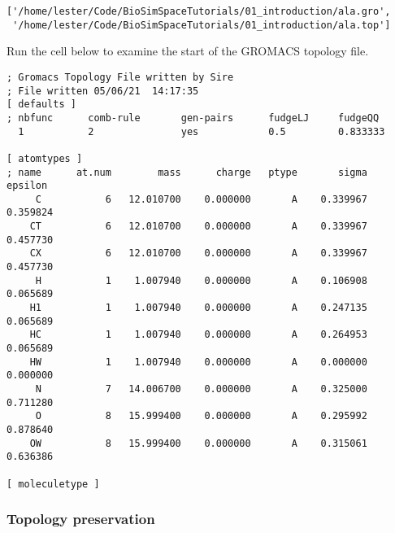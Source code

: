 \begin{Shaded}
\begin{Highlighting}[]
\NormalTok{, system, [}\NormalTok{, }\NormalTok{])}
\end{Highlighting}
\end{Shaded}

\begin{verbatim}
['/home/lester/Code/BioSimSpaceTutorials/01_introduction/ala.gro',
 '/home/lester/Code/BioSimSpaceTutorials/01_introduction/ala.top']
\end{verbatim}

Run the cell below to examine the start of the GROMACS topology file.

\begin{Shaded}
\begin{Highlighting}[]
\OperatorTok{!}\OperatorTok{-}
\end{Highlighting}
\end{Shaded}

\begin{verbatim}
; Gromacs Topology File written by Sire
; File written 05/06/21  14:17:35
[ defaults ]
; nbfunc      comb-rule       gen-pairs      fudgeLJ     fudgeQQ
  1           2               yes            0.5         0.833333

[ atomtypes ]
; name      at.num        mass      charge   ptype       sigma     epsilon
     C           6   12.010700    0.000000       A    0.339967    0.359824
    CT           6   12.010700    0.000000       A    0.339967    0.457730
    CX           6   12.010700    0.000000       A    0.339967    0.457730
     H           1    1.007940    0.000000       A    0.106908    0.065689
    H1           1    1.007940    0.000000       A    0.247135    0.065689
    HC           1    1.007940    0.000000       A    0.264953    0.065689
    HW           1    1.007940    0.000000       A    0.000000    0.000000
     N           7   14.006700    0.000000       A    0.325000    0.711280
     O           8   15.999400    0.000000       A    0.295992    0.878640
    OW           8   15.999400    0.000000       A    0.315061    0.636386

[ moleculetype ]
\end{verbatim}

\hypertarget{topology-preservation}{%
\subsubsection{Topology preservation}\label{topology-preservation}}


